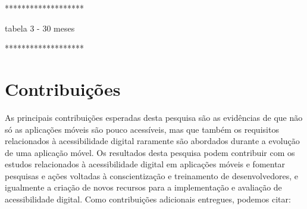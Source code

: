 *******************

tabela 3 - 30 meses

*******************




\begin{table}[!htb]
	\centering
	\caption{Cronograma - tabela teste apenas - versão 2}
	\label{tab:cronograma}
\end{table}


\section{Contribuições}
As principais contribuições esperadas desta pesquisa são as evidências de que não só as aplicações móveis são pouco acessíveis, mas que também os requisitos relacionados à acessibilidade digital raramente são abordados durante a evolução de uma aplicação móvel.
Os resultados desta pesquisa podem contribuir com os estudos relacionados à acessibilidade digital em aplicações móveis e fomentar pesquisas e ações voltadas à conscientização e treinamento de desenvolvedores, e igualmente a criação de novos recursos para
a implementação e avaliação de acessibilidade digital.
Como contribuições adicionais entregues, podemos citar:

